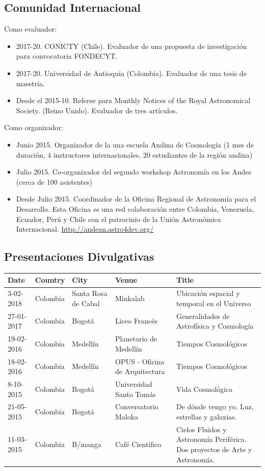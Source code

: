 \documentclass{article}
\begin{document}
\subsection{Comunidad Internacional}

Como evaluador:
\begin{itemize}
\item 2017-20. CONICTY (Chile). Evaluador de una propuesta de
  investigaci\'on para convocatoria FONDECYT.
\item 2017-20. Universidad de Antioquia (Colombia). Evaluador de una tesis de
  maestr\'ia.  
\item Desde el 2015-10. Referee para Monthly Notices of the Royal
  Astronomical Society. (Reino Unido). Evaluador de tres art\'iculos.
\end{itemize}


Como organizador:
\begin{itemize}
\item {Junio 2015. Organizador de la una escuela Andina de Cosmolog\'ia (1 mes de
  duraci\'on, 4 instructores internacionales, 20 estudiantes de la
  regi\'on andina)}
\item {Julio 2015. Co-organizador del segundo workshop Astronom\'ia en los Andes
  (cerca de 100 asistentes)}
\item {Desde Julio 2015. Coordinador de la Oficina Regional de
  Astronom\'ia para el Desarrollo. Esta Oficina es una red
  colaboraci\'on entre Colombia, Venezuela, Ecuador, Per\'u y Chile
  con el patrocinio de la Uni\'on Astron\'omica Internacional. 
\url{http://andean.astro4dev.org/}}    
\end{itemize}

\subsection{Presentaciones Divulgativas}

\begin{tabular}{p{1.7cm} p{1.2cm} p{2.0cm} p{5.0cm} p{4.5cm}}\hline
Date & Country & City& Venue& Title\\\hline

3-02-2018 & Colombia & Santa Rosa de Cabal & Minkalab & Ubicaci\'on
espacial y temporal en el Universo\\
27-01-2017 & Colombia & Bogot\'a & Liceo Franc\'es & Generalidades de Astrof\'isica y Cosmolog\'ia\\
19-02-2016 & Colombia & Medell\'in & Planetario de Medell\'in & Tiempos Cosmol\'ogicos\\
18-02-2016 & Colombia & Medell\'in & OPUS - Oficina de Arquitectura & Tiempos Cosmol\'ogicos\\
8-10-2015  & Colombia & Bogot\'a & Universidad Santo Tom\'as & Vida Cosmol\'ogica \\
21-05-2015 & Colombia & Bogot\'a & Conversatorio Maloka & De d\'onde vengo yo. Luz, estrellas y galaxias.\\
11-03-2015 & Colombia & B/manga & Caf\'e Cient\'ifico & Cielos Fluidos y Astronom\'ia Perif\'erica. Dos proyectos de Arte y Astronom\'ia.\\\hline
\end{tabular}
\end{document}
